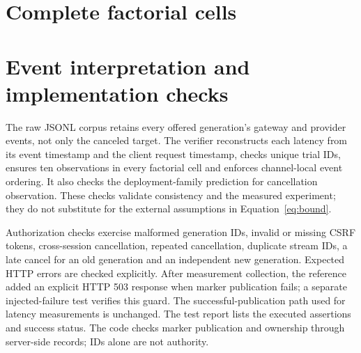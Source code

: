 \documentclass[11pt,a4paper]{article}
\begin{document}
\appendix
\section{Complete factorial cells}\label{app:cells}

\FloatBarrier
\section{Event interpretation and implementation checks}
The raw JSONL corpus retains every offered generation's gateway and provider events, not only the canceled target. The verifier reconstructs each latency from its event timestamp and the client request timestamp, checks unique trial IDs, ensures ten observations in every factorial cell and enforces channel-local event ordering. It also checks the deployment-family prediction for cancellation observation. These checks validate consistency and the measured experiment; they do not substitute for the external assumptions in Equation~\eqref{eq:bound}.

Authorization checks exercise malformed generation IDs, invalid or missing CSRF tokens, cross-session cancellation, repeated cancellation, duplicate stream IDs, a late cancel for an old generation and an independent new generation. Expected HTTP errors are checked explicitly. After measurement collection, the reference added an explicit HTTP 503 response when marker publication fails; a separate injected-failure test verifies this guard. The successful-publication path used for latency measurements is unchanged. The test report lists the executed assertions and success status. The code checks marker publication and ownership through server-side records; IDs alone are not authority.
\end{document}

